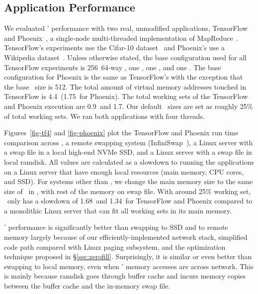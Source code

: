 \subsection{Application Performance}
\label{sec:appresults}
We evaluated \lego' performance with two real, unmodified applications, 
TensorFlow~\cite{TensorFlow} and Phoenix~\cite{Ranger07-HPCA}, a single-node multi-threaded implementation of MapReduce~\cite{DeanEtAl04-MapReduce}.
TensorFlow's experiments use the Cifar-10 dataset~\cite{CIFAR-DS} and Phoenix's use a Wikipedia dataset~\cite{Wiki-DS}.
Unless otherwise stated, the base configuration used for all TensorFlow experiments
is 256\MB\ 64-way \excache, one \pcomponent, one \mcomponent, and one \scomponent.
The base configuration for Phoenix is the same as TensorFlow's with the exception that the base \excache\ size is 512\MB.
The total amount of virtual memory addresses touched in TensorFlow is 4.4\GB\ (1.75\GB\ for Phoenix).
The total working sets of the TensorFlow and Phoenix execution are 0.9\GB\ and 1.7\GB.
Our default \excache\ sizes are set as roughly 25\% of total working sets.
We ran both applications with four threads.

Figures~\ref{fig-tf4} and \ref{fig-phoenix} plot the TensorFlow and Phoenix run time comparison across 
\lego, a remote swapping system (InfiniSwap~\cite{GU17-NSDI}), 
a Linux server with a swap file in a local high-end NVMe SSD, 
and a Linux server with a swap file in local ramdisk.
All values are calculated as a slowdown to running the applications on a Linux server that have enough local resources (main memory, CPU cores, and SSD).
For systems other than \lego, we change the main memory size to the same size of \excache\ in \lego, with rest of the memory on swap file. 
With around 25\% working set, \lego\ only has a slowdown of 1.68\x\ and 1.34\x\ for TensorFlow and Phoenix
compared to a monolithic Linux server that can fit all working sets in its main memory.

\lego' performance is significantly better than swapping to SSD and to remote memory 
largely because of our efficiently-implemented network stack, simplified code path compared with Linux paging subsystem,
and the optimization technique proposed in \S\ref{sec:zerofill}.
Surprisingly, it is similar or even better than swapping to local memory, even when \lego' memory accesses are across network.
This is mainly because ramdisk goes through buffer cache and incurs memory copies between the buffer cache and the in-memory swap file.

